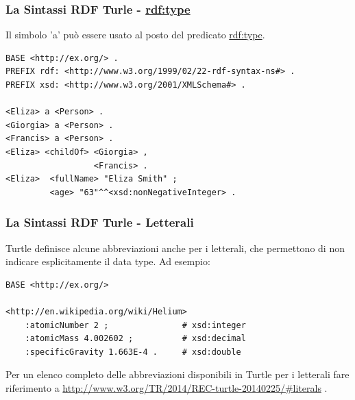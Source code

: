 \documentclass[8pt]{beamer}
\begin{document}
\begin{frame}[fragile]
 \frametitle{La Sintassi RDF Turle - \url{rdf:type}}

Il simbolo 'a' pu\`o essere usato al posto del predicato \url{rdf:type}.

\begin{Verbatim}[fontsize=\small]
BASE <http://ex.org/> .
PREFIX rdf: <http://www.w3.org/1999/02/22-rdf-syntax-ns#> .
PREFIX xsd: <http://www.w3.org/2001/XMLSchema#> .

<Eliza> a <Person> .
<Giorgia> a <Person> .
<Francis> a <Person> .
<Eliza> <childOf> <Giorgia> ,
                  <Francis> .
<Eliza>  <fullName> "Eliza Smith" ;
         <age> "63"^^<xsd:nonNegativeInteger> .
\end{Verbatim}
\end{frame}

\begin{frame}[fragile]
 \frametitle{La Sintassi RDF Turle - Letterali}

Turtle definisce alcune abbreviazioni anche per i letterali,
che permettono di non indicare esplicitamente il data type.
Ad esempio:

\begin{Verbatim}[fontsize=\small]
BASE <http://ex.org/>

<http://en.wikipedia.org/wiki/Helium>                                                                                  
    :atomicNumber 2 ;               # xsd:integer                                                                      
    :atomicMass 4.002602 ;          # xsd:decimal                                                                      
    :specificGravity 1.663E-4 .     # xsd:double   
\end{Verbatim}
\vspace{\baselineskip}

Per un elenco completo delle abbreviazioni disponibili in Turtle per i
letterali fare riferimento a \url{http://www.w3.org/TR/2014/REC-turtle-20140225/\#literals} .
\end{frame}
\end{document}
